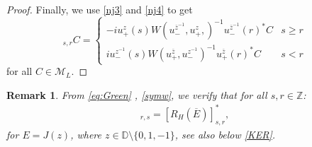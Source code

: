\documentclass[12pt,oneside,onecolumn,open]{article}
\newtheorem{obs}[teo]{Remark}
\begin{document}
\begin{proof}
Finally, we use  \eqref{nj3} and \eqref{nj4} to get
 \begin{equation}
    [R_{H}(E)]_{s,r}C=
 \left\{ \begin{array}{lcc}
             -iu_{+}^{z}(s) W(u_{-}^{\overline{z}^{-1}},u_{+}^{z},)^{-1} u_{-}^{\overline{z}^{-1}}(r)^{*}C &   s\geq r \\
            iu_{-}^{z^{-1}}(s) W(u_{+}^{\overline{z}}, u_{-}^{z^{-1}})^{-1} u_{+}^{\overline{z}}(r)^{*}C &  s< r
             \end{array}
   \right.
   \end{equation}  for all $C\in \mathcal{M}_L.$
\end{proof}
\begin{obs}
    From \eqref{eq:Green} ,  \eqref{symw},  we verify that  for all $s,r\in \mathbb{Z}$:
    \begin{align}
        [R_{H}(E)]_{r,s}=[R_{H}(\overline{E})]_{s,r}^{*},
    \end{align}
    for $E=J(z)$, where $z \in \mathbb{D}\setminus \{0, 1, -1\}$, see also below \eqref{KER}. 
\end{obs}
\end{document}
